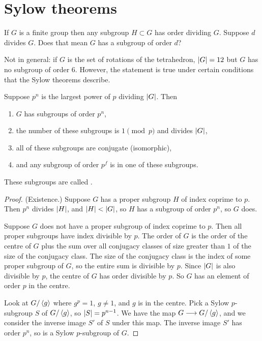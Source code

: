 \documentclass[11pt, oneside]{amsart}
\begin{document}
\section{Sylow theorems}
If $G$ is a finite group then any subgroup $H\subset G$ has order dividing $G$. Suppose $d$ divides $G$. Does that mean $G$ has a subgroup of order $d$? 

Not in general: if $G$ is the set of rotations of the tetrahedron, $\left \lvert G \right \rvert = 12$ but $G$ has no subgroup of order $6$. However, the statement is true under certain conditions that the Sylow theorems describe.

\begin{theorem}[Sylow]\label{Sylow}
Suppose $p^n$ is the largest power of $p$ dividing $\left \lvert G \right \rvert$. Then
\begin{enumerate}
\item $G$ has subgroups of order $p^n$,
\item the number of these subgroups is $1\pmod p$ and divides $\left \lvert G \right \rvert$,
\item all of these subgroups are conjugate (isomorphic),
\item and any subgroup of order $p^f$ is in one of these subgroups.
\end{enumerate}
\end{theorem}
These subgroups are called .
\begin{proof}
(Existence.) Suppose $G$ has a proper subgroup $H$ of index coprime to $p$. Then $p^n$ divides $\left \lvert H \right \rvert$, and $\left \lvert H \right \rvert < \left \lvert G \right \rvert$, so $H$ has a subgroup of order $p^n$, so $G$ does.

Suppose $G$ does not have a proper subgroup of index coprime to $p$. Then all proper subgroups have index divisible by $p$. The order of $G$ is the order of the centre of $G$ plus the sum over all conjugacy classes of size greater than $1$ of the size of the conjugacy class. The size of the conjugacy class is the index of some proper subgroup of $G$, so the entire sum is divisible by $p$. Since $\left \lvert G \right \rvert$ is also divisible by $p$, the centre of $G$ has order divisible by $p$. So $G$ has an element of order $p$ in the centre. 

Look at $G/\left \langle g \right \rangle$ where $g^p = 1$, $g\neq 1$, and $g$ is in the centre. Pick a Sylow $p$-subgroup $S$ of $G/\left \langle g \right \rangle $, so $\left \lvert S \right \rvert = p^{n-1}$. We have the map $G\longrightarrow G/\left \langle g \right \rangle$, and we consider the inverse image $S'$ of $S$ under this map. The inverse image $S'$ has order $p^n$, so is a Sylow $p$-subgroup of $G$.
\end{proof}
\end{document}
